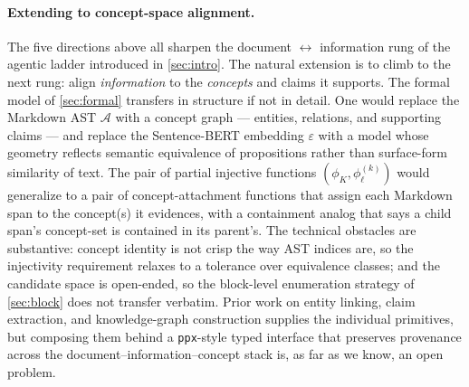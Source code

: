 \documentclass{article}
\theoremstyle{definition}
\begin{document}
\paragraph{Extending to concept-space alignment.}
The five directions above all sharpen the document $\leftrightarrow$
information rung of the agentic ladder introduced in
\cref{sec:intro}.  The natural extension is to climb to the next
rung: align \emph{information} to the \emph{concepts} and claims it
supports.  The formal model of \cref{sec:formal} transfers in
structure if not in detail.  One would replace the Markdown AST
$\mathcal{A}$ with a concept graph --- entities, relations, and
supporting claims --- and replace the Sentence-BERT embedding
$\varepsilon$ with a model whose geometry reflects semantic
equivalence of propositions rather than surface-form similarity of
text.  The pair of partial injective functions
$(\phi_K, \phi_\ell^{(k)})$ would generalize to a pair of
concept-attachment functions that assign each Markdown span to the
concept(s) it evidences, with a containment analog that says a
child span's concept-set is contained in its parent's.  The
technical obstacles are substantive: concept identity is not
crisp the way AST indices are, so the injectivity requirement
relaxes to a tolerance over equivalence classes; and the candidate
space is open-ended, so the block-level enumeration strategy of
\cref{sec:block} does not transfer verbatim.  Prior work on
entity linking, claim extraction, and knowledge-graph construction
supplies the individual primitives, but composing them behind a
\texttt{ppx}-style typed interface that preserves provenance across
the document--information--concept stack is, as far as we know, an
open problem.
\end{document}
